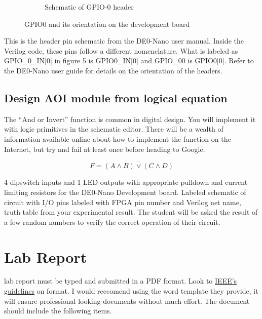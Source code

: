 \begin{figure}
\begin{subfigure}[b]{.45\textwidth}
            \caption{Schematic of GPIO-0 header\cite{DE0Manual}}
          \end{subfigure}
          \caption{GPIO0 and its orientation on the development board}
          \label{pinmap}
        \end{figure}
        This is the header pin schematic from the DE0-Nano user manual. Inside the Verilog code, these pins follow a different nomenclature. What is labeled as GPIO\_0\_IN[0] in figure 5 is GPIO0\_IN[0] and GPIO\_00 is GPIO0[0]. Refer to the DE0-Nano user guide for details on the orientation of the headers.        

      \subsection{Design AOI module from logical equation} 
        The ``And or Invert'' function is common in digital design. You will implement it with logic primitives in the schematic editor. There will be a wealth of information available online about how to implement the function on the Internet, but try and fail at least once before heading to Google.

      \begin{displaymath}
        F = \overline{(A \wedge B) \vee (C \wedge D)}
      \end{displaymath}

                    {4 dipswitch inputs and 1 LED outputs with appropriate pulldown and current limiting resistors for the DE0-Nano Development board. }
                    {Labeled schematic of circuit with I/O pins labeled with FPGA pin number and Verilog net name,  truth table from your  experimental result.}
                    {The student will be asked the result of a few random numbers to verify the correct operation of their circuit.}

  \section{Lab Report}
     lab report must be typed and submitted in a PDF format. Look to \href{http://www.ieee.org/conferences_events/conferences/publishing/templates.html}{IEEE's guidelines} on format. I would reccomend  using the word template they provide, it will ensure professional looking documents without much effort. The document should include the following items.
    
